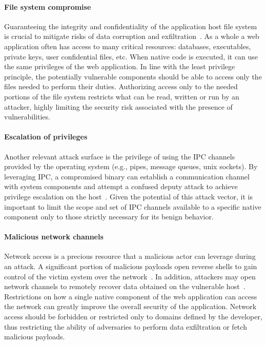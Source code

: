 \paragraph{{File system compromise}}
Guaranteeing the integrity and confidentiality of the application host
file system is crucial to mitigate risks of data corruption and
exfiltration~\cite{berman1995tron}. As a whole a web application often has access
to many critical resources: databases, executables, private keys, user
confidential files, etc. When native code is executed, it can use the
same privileges of the web application.  In line with the
least privilege principle, the potentially vulnerable components
should be able to access only the files needed to perform their
duties.  Authorizing access only to the needed portions of the
file system restricts what can be read, written or run by an attacker,
highly limiting the security risk associated with the presence of
vulnerabilities.

\paragraph{Escalation of privileges}
Another relevant attack surface is the privilege of using the IPC
channels provided by the operating system (e.g., pipes, message
queues, unix sockets). By leveraging IPC, a compromised binary can
establish a communication channel with system components and attempt a
confused deputy attack to achieve privilege escalation on the
host~\cite{shao2016misuse, bui2018man}.  Given the potential of this
attack vector, it is important to limit the scope and set of IPC
channels available to a specific native component only to those strictly
necessary for its benign behavior.

\paragraph{{Malicious network channels}}
Network access is a precious resource that a malicious actor can
leverage during an attack. A significant portion of malicious payloads
open reverse shells to gain control of the victim system over the
network~\cite{bulekov2021saphire}.  In addition, attackers may open
network channels to remotely recover data obtained on the vulnerable
host~\cite{schwarz2020seng}. Restrictions on how a single native component of the
web application can access the network can greatly improve the overall
security of the application. Network access should be forbidden or
restricted only to domains defined by the developer, thus restricting
the ability of adversaries to perform data exfiltration or fetch
malicious payloads.

